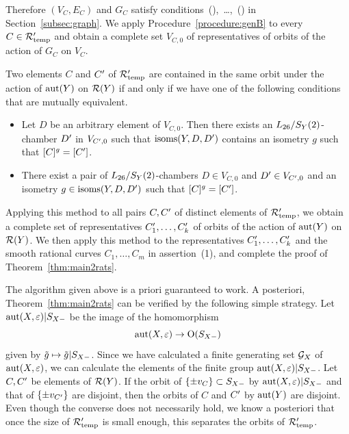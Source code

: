 \documentclass{amsart}
\numberwithin{procedure}{section}
\begin{document}
Therefore $(V_C, E_C)$ and $G_C$
satisfy conditions~(),~\dots,~()
in Section~\ref{subsec:graph}.
We apply Procedure~\ref{procedure:genB}
to every $C\in \mathord{\mathcal R}_{\mathord{\rm temp}}\sp\prime$
and obtain a complete  set $V_{C,0}$
of representatives of orbits of 
the action of $G_C$ on $V_C$.
\par
Two elements $C$ and $C\sp\prime$ of $\mathord{\mathcal R}_{\mathord{\rm temp}}\sp\prime$
are contained in the same orbit
under the action of $\mathord{\rm{aut}}(Y)$ on $\mathord{\mathcal R}(Y)$
if and only if we have one of the following conditions 
that are mutually equivalent.
%
\begin{itemize}
\item
Let $D$ be an arbitrary  element of $V_{C, 0}$.
Then there exists an $L_{26}/S_Y(2)$-chamber $D\sp\prime $ in $V_{C\sp\prime, 0}$
such that $\mathord{\rm isoms}(Y, D, D\sp\prime)$ contains an isometry
$g$ such  that $[C]^g=[C\sp\prime]$.
\item
There exist a pair of  $L_{26}/S_Y(2)$-chambers 
$D\in V_{C, 0}$ and 
$D\sp\prime \in V_{C\sp\prime, 0}$ and an isometry 
$g\in \mathord{\rm isoms}(Y, D, D\sp\prime)$ 
such  that $[C]^g=[C\sp\prime]$.
\end{itemize}
%
Applying this method to all pairs $C, C\sp\prime$ of
distinct elements of $\mathord{\mathcal R}_{\mathord{\rm temp}}\sp\prime$,
we obtain a complete set of representatives 
$C_1\sp\prime, \dots, C_k\sp\prime$  of orbits of 
the action of $\mathord{\rm{aut}}(Y)$ on $\mathord{\mathcal R}(Y)$.
We then apply this method to the representatives $C_1\sp\prime, \dots, C_k\sp\prime$ 
and the smooth rational curves $C_1, \dots, C_m$
in assertion~(1),
and complete the proof of Theorem~\ref{thm:main2rats}.
%
\par
The algorithm given above is a priori guaranteed to work.
A posteriori, Theorem~\ref{thm:main2rats} can be verified by the following simple strategy.
Let $\mathord{\rm{aut}}(X, \varepsilon)|S_{X-}$ be the image of 
 the homomorphism
\[
\mathord{\rm{aut}}(X, \varepsilon)\to \mathord{\mathrm{O}}(S_{X-})
\]
given by $\tilde{g}\mapsto \tilde{g}|S_{X-}$.
Since we have calculated a finite generating set $\mathord{\mathcal G}_X$ of $\mathord{\rm{aut}}(X, \varepsilon)$,
we can calculate the elements of the finite group $\mathord{\rm{aut}}(X, \varepsilon)|S_{X-}$.
Let  $C, C\sp\prime$ be elements of $\mathord{\mathcal R}(Y)$.
If the orbit of $\{\pm v_C\}\subset S_{X-}$ by $\mathord{\rm{aut}}(X, \varepsilon)|S_{X-}$ 
and that of $\{\pm v_{C\sp\prime}\}$ are disjoint, 
then the orbits of $C$ and $C\sp\prime$ by $\mathord{\rm{aut}}(Y)$ are disjoint.
Even though the converse does not necessarily hold,
we know a posteriori that once the size of $\mathord{\mathcal R}_{\mathord{\rm temp}}\sp\prime$ is small enough,
this separates the orbits of $\mathord{\mathcal R}_{\mathord{\rm temp}}\sp\prime$.
%
\end{document}
